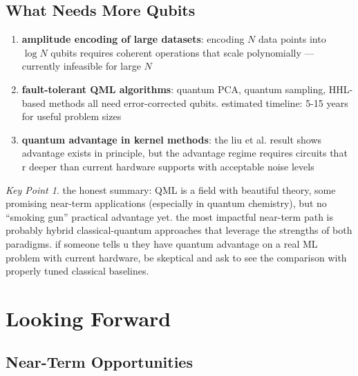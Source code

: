 \documentclass[11pt,a4paper]{article}
\theoremstyle{definition}
\theoremstyle{remark}
\newtheorem*{keypoint}{Key Point}
\begin{document}
\subsection{What Needs More Qubits}

\begin{enumerate}[label=\arabic*.]
    \item \textbf{amplitude encoding of large datasets}: encoding $N$ data points into $\log N$ qubits requires coherent operations that scale polynomially --- currently infeasible for large $N$

    \item \textbf{fault-tolerant QML algorithms}: quantum PCA, quantum sampling, HHL-based methods all need error-corrected qubits. estimated timeline: 5-15 years for useful problem sizes

    \item \textbf{quantum advantage in kernel methods}: the liu et al. result shows advantage exists in principle, but the advantage regime requires circuits that r deeper than current hardware supports with acceptable noise levels
\end{enumerate}

\begin{keypoint}
the honest summary: QML is a field with beautiful theory, some promising near-term applications (especially in quantum chemistry), but no ``smoking gun'' practical advantage yet. the most impactful near-term path is probably hybrid classical-quantum approaches that leverage the strengths of both paradigms. if someone tells u they have quantum advantage on a real ML problem with current hardware, be skeptical and ask to see the comparison with properly tuned classical baselines.
\end{keypoint}

\section{Looking Forward}

\subsection{Near-Term Opportunities}
\end{document}
